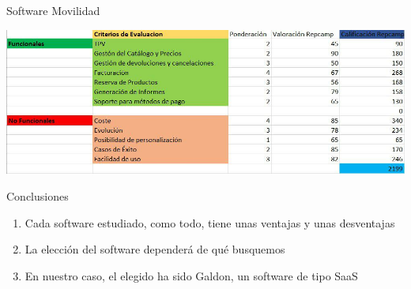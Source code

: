 \documentclass{beamer}
\begin{document}
\begin{frame}{Software Movilidad}

\begin{center}
\includegraphics[scale=0.3]{imagenes/Repcamp.jpg} 
\end{center}
	
\end{frame}	




\begin{frame}{Conclusiones}

\begin{enumerate}
	\item Cada software estudiado, como todo, tiene unas ventajas y unas desventajas
	\item La elección del software dependerá de qué busquemos
	\item En nuestro caso, el elegido ha sido Galdon, un software de tipo SaaS
\end{enumerate}
	
\end{frame}
	
\end{document}
